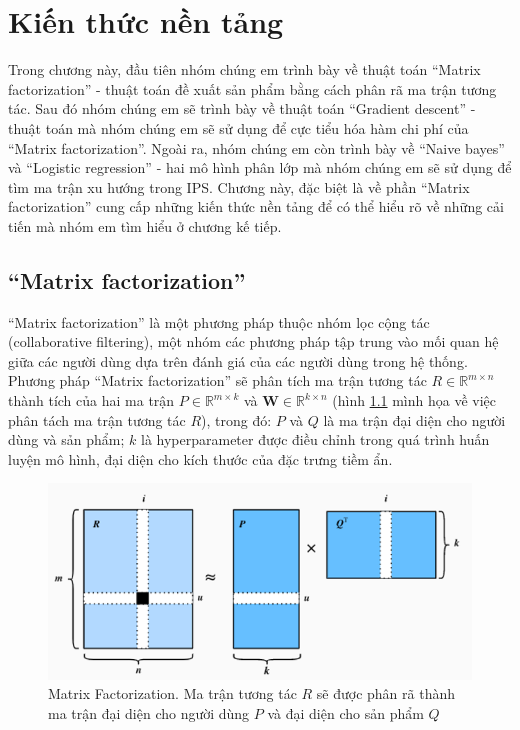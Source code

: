 \chapter{Kiến thức nền tảng}
\label{Chapter2}

Trong chương này, đầu tiên nhóm chúng em trình bày về thuật toán ``Matrix factorization'' - thuật toán đề xuất sản phẩm bằng cách phân rã ma trận tương tác. Sau đó nhóm chúng em sẽ trình bày về thuật toán ``Gradient descent'' - thuật toán mà nhóm chúng em sẽ sử dụng để cực tiểu hóa hàm chi phí của  ``Matrix factorization''. Ngoài ra, nhóm chúng em còn trình bày về ``Naive bayes'' và ``Logistic regression'' - hai mô hình phân lớp mà nhóm chúng em sẽ sử dụng để tìm ma trận xu hướng trong IPS. Chương này, đặc biệt là về phần ``Matrix factorization'' cung cấp những kiến thức nền tảng để có thể hiểu rõ về những cải tiến mà nhóm em tìm hiểu ở chương kế tiếp.

\section{``Matrix factorization''}
``Matrix factorization'' là một phương pháp thuộc nhóm lọc cộng tác (collaborative filtering), một nhóm các phương pháp tập trung vào mối quan hệ giữa các người dùng dựa trên đánh giá của các người dùng trong hệ thống. 
Phương pháp ``Matrix factorization'' sẽ phân tích ma trận tương tác $R \in \mathbb{R}^{m \times n}$ thành tích của hai ma trận $P \in \mathbb{R}^{m \times k}$ và $\mathbf{W} \in \mathbb{R}^{k \times n}$ (hình \ref{fig:chap2_MF1} mình họa về việc phân tách ma trận tương tác $R$), trong đó: $P$ và  $Q$ là ma trận đại diện cho người dùng và sản phẩm; $k$ là hyperparameter được điều chỉnh trong quá trình huấn luyện mô hình, đại diện cho kích thước của đặc trưng tiềm ẩn.

\begin{figure}[h]
    \centering
    \includegraphics[width = \textwidth]{Chapter2/MF1.png}
    \caption{Matrix Factorization. Ma trận tương tác $R$ sẽ được phân rã thành ma trận đại diện cho người dùng $P$ và đại diện cho sản phẩm $Q$}
    \label{fig:chap2_MF1}
\end{figure}

